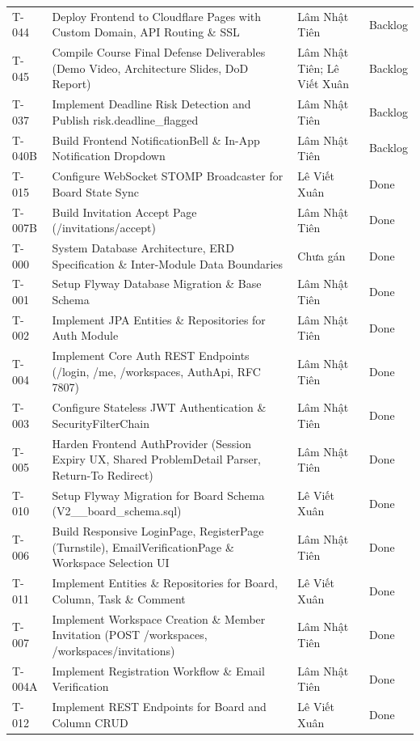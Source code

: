 \documentclass[12pt,a4paper]{report}
\begin{document}
\begin{longtable}{@{}p{1.3cm}p{8.0cm}p{2.7cm}p{2.4cm}@{}}
T-044 & Deploy Frontend to Cloudflare Pages with Custom Domain, API Routing \& SSL & Lâm Nhật Tiên & Backlog \\
T-045 & Compile Course Final Defense Deliverables (Demo Video, Architecture Slides, DoD Report) & Lâm Nhật Tiên; Lê Viết Xuân & Backlog \\
T-037 & Implement Deadline Risk Detection and Publish risk.deadline\_flagged & Lâm Nhật Tiên & Backlog \\
T-040B & Build Frontend NotificationBell \& In-App Notification Dropdown & Lâm Nhật Tiên & Backlog \\
T-015 & Configure WebSocket STOMP Broadcaster for Board State Sync & Lê Viết Xuân & Done \\
T-007B & Build Invitation Accept Page (/invitations/accept) & Lâm Nhật Tiên & Done \\
T-000 & System Database Architecture, ERD Specification \& Inter-Module Data Boundaries & Chưa gán & Done \\
T-001 & Setup Flyway Database Migration \& Base Schema & Lâm Nhật Tiên & Done \\
T-002 & Implement JPA Entities \& Repositories for Auth Module & Lâm Nhật Tiên & Done \\
T-004 & Implement Core Auth REST Endpoints (/login, /me, /workspaces, AuthApi, RFC 7807) & Lâm Nhật Tiên & Done \\
T-003 & Configure Stateless JWT Authentication \& SecurityFilterChain & Lâm Nhật Tiên & Done \\
T-005 & Harden Frontend AuthProvider (Session Expiry UX, Shared ProblemDetail Parser, Return-To Redirect) & Lâm Nhật Tiên & Done \\
T-010 & Setup Flyway Migration for Board Schema (V2\_\_board\_schema.sql) & Lê Viết Xuân & Done \\
T-006 & Build Responsive LoginPage, RegisterPage (Turnstile), EmailVerificationPage \& Workspace Selection UI & Lâm Nhật Tiên & Done \\
T-011 & Implement Entities \& Repositories for Board, Column, Task \& Comment & Lê Viết Xuân & Done \\
T-007 & Implement Workspace Creation \& Member Invitation (POST /workspaces, /workspaces/invitations) & Lâm Nhật Tiên & Done \\
T-004A & Implement Registration Workflow \& Email Verification & Lâm Nhật Tiên & Done \\
T-012 & Implement REST Endpoints for Board and Column CRUD & Lê Viết Xuân & Done \\

\end{longtable}
\end{document}
